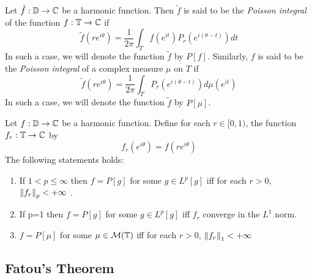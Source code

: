 \begin{definition}
    Let $\tilde{f} : \mathbb D \to \mathbb C$ be a harmonic function. Then $\tilde{f}$ is said to be the \textit{Poisson integral} of the function $f : \mathbb T \to \mathbb C$ if
    \begin{equation*}
	\tilde{f} (re^{i\theta}) = \frac{1}{2\pi} \int_{T} f\left( e^{it} \right) P_{r} \left( e^{i\left( \theta-t \right)} \right) dt
    \end{equation*}
    In such a case, we will denote the function $\tilde{f}$ by $P[f]$.
    Similarly, $f$ is said to be the \textit{Poisson integral} of a complex measure $\mu$ on $T$ if
\begin{equation*}
    \tilde{f} (re^{i\theta}) = \frac{1}{2\pi} \int_{T} P_{r} \left( e^{i\left( \theta-t \right)} \right) d\mu\left( e^{it} \right)
    \end{equation*}In such a case, we will denote the function $\tilde{f}$ by $P[\mu]$.
    \label{def:Poisson-Integral-Of-Some-Function-Or-Measure}
\end{definition}

\begin{theorem}
    Let $f : \mathbb D \to \mathbb C$ be a harmonic function. Define for each $r\in [0,1)$, the function $f_{r} : \mathbb T \to \mathbb C$ by
    \begin{equation*}
	f_{r} \left( e^{i\theta} \right) = f\left( re^{i\theta} \right)
    \end{equation*}
    The following statements holds:
    \begin{enumerate}
	\item If $1 < p \le \infty$ then $f=P[g]$ for some $g \in L^{p} [g]$ iff for each $r > 0$, $\left\lVert f_{r} \right\rVert_{p} < +\infty$ .
	\item If p=1 then $f=P[g]$ for some $g \in L^{p} [g]$ iff $f_{r}$ converge in the $L^{1}$ norm.
	\item $f=P[\mu]$ for some $\mu \in {\cal M} (\mathbb T)$ iff for each $r > 0$, $\left\lVert f_{r} \right\rVert_{1} < +\infty$ 
    \end{enumerate}
    \label{thm:convergence-Poisson}
\end{theorem}
\subsection{Fatou's Theorem}

